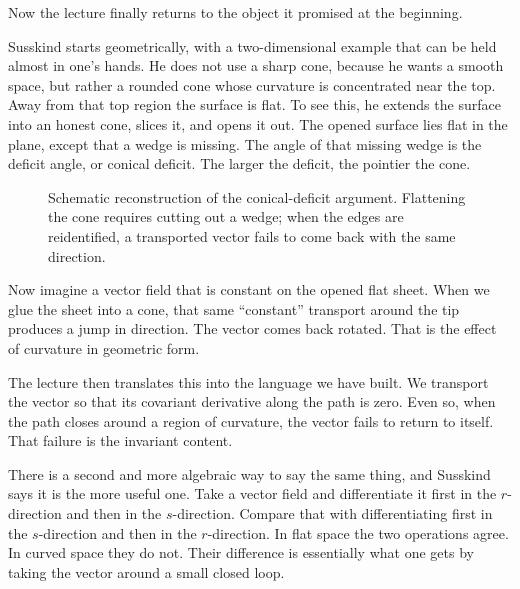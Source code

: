 Now the lecture finally returns to the object it promised at the beginning.

Susskind starts geometrically, with a two-dimensional example that can be held almost in one's hands. He does not use a sharp cone, because he wants a smooth space, but rather a rounded cone whose curvature is concentrated near the top. Away from that top region the surface is flat. To see this, he extends the surface into an honest cone, slices it, and opens it out. The opened surface lies flat in the plane, except that a wedge is missing. The angle of that missing wedge is the deficit angle, or conical deficit. The larger the deficit, the pointier the cone.

\begin{figure}[h]
\centering
{}
\caption{Schematic reconstruction of the conical-deficit argument. Flattening the cone requires cutting out a wedge; when the edges are reidentified, a transported vector fails to come back with the same direction.}
\end{figure}

Now imagine a vector field that is constant on the opened flat sheet. When we glue the sheet into a cone, that same ``constant'' transport around the tip produces a jump in direction. The vector comes back rotated. That is the effect of curvature in geometric form.

The lecture then translates this into the language we have built. We transport the vector so that its covariant derivative along the path is zero. Even so, when the path closes around a region of curvature, the vector fails to return to itself. That failure is the invariant content.

There is a second and more algebraic way to say the same thing, and Susskind says it is the more useful one. Take a vector field and differentiate it first in the \(r\)-direction and then in the \(s\)-direction. Compare that with differentiating first in the \(s\)-direction and then in the \(r\)-direction. In flat space the two operations agree. In curved space they do not. Their difference is essentially what one gets by taking the vector around a small closed loop.

